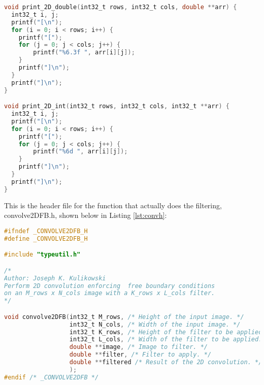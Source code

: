 \documentclass{article}
\begin{document}
\begin{lstlisting}[language=C, caption=filter\_image\_section3.c, label={lst:sec3}]
void print_2D_double(int32_t rows, int32_t cols, double **arr) {
  int32_t i, j;
  printf("[\n");
  for (i = 0; i < rows; i++) {
    printf("[");
    for (j = 0; j < cols; j++) {
        printf("%6.3f ", arr[i][j]);
    }
    printf("]\n");
  }
  printf("]\n");
}

void print_2D_int(int32_t rows, int32_t cols, int32_t **arr) {
  int32_t i, j;
  printf("[\n");
  for (i = 0; i < rows; i++) {
    printf("[");
    for (j = 0; j < cols; j++) {
        printf("%6d ", arr[i][j]);
    }
    printf("]\n");
  }
  printf("]\n");
}
\end{lstlisting}
\newpage
This is the header file for the function that actually does the filtering, convolve2DFB.h, shown below in Listing \ref{lst:convh}:

\begin{lstlisting}[language=C, caption=convolve2DFB.h, label={lst:convh}]
#ifndef _CONVOLVE2DFB_H
#define _CONVOLVE2DFB_H

#include "typeutil.h"

/*
Author: Joseph K. Kulikowski
Perform 2D convolution enforcing  free boundary conditions
on an M_rows x N_cols image with a K_rows x L_cols filter.
*/

void convolve2DFB(int32_t M_rows, /* Height of the input image. */
                  int32_t N_cols, /* Width of the input image. */
                  int32_t K_rows, /* Height of the filter to be applied. */
                  int32_t L_cols, /* Width of the filter to be applied. */
                  double **image, /* Image to filter. */
                  double **filter, /* Filter to apply. */
                  double **filtered /* Result of the 2D convolution. */
                  );
#endif /* _CONVOLVE2DFB */
\end{lstlisting}
\end{document}
